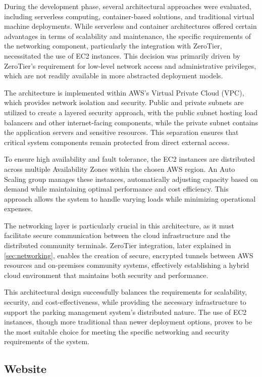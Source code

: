 During the development phase, several architectural approaches were evaluated, including serverless computing, container-based solutions, and traditional virtual machine deployments. While serverless and container architectures offered certain advantages in terms of scalability and maintenance, the specific requirements of the networking component, particularly the integration with ZeroTier, necessitated the use of EC2 instances. This decision was primarily driven by ZeroTier's requirement for low-level network access and administrative privileges, which are not readily available in more abstracted deployment models.

The architecture is implemented within AWS's Virtual Private Cloud (VPC), which provides network isolation and security. Public and private subnets are utilized to create a layered security approach, with the public subnet hosting load balancers and other internet-facing components, while the private subnet contains the application servers and sensitive resources. This separation ensures that critical system components remain protected from direct external access.

To ensure high availability and fault tolerance, the EC2 instances are distributed across multiple Availability Zones within the chosen AWS region. An Auto Scaling group manages these instances, automatically adjusting capacity based on demand while maintaining optimal performance and cost efficiency. This approach allows the system to handle varying loads while minimizing operational expenses.

The networking layer is particularly crucial in this architecture, as it must facilitate secure communication between the cloud infrastructure and the distributed community terminals. ZeroTier integration, later explained in \cref{sec:networking}, enables the creation of secure, encrypted tunnels between AWS resources and on-premises community systems, effectively establishing a hybrid cloud environment that maintains both security and performance.

This architectural design successfully balances the requirements for scalability, security, and cost-effectiveness, while providing the necessary infrastructure to support the parking management system's distributed nature. The use of EC2 instances, though more traditional than newer deployment options, proves to be the most suitable choice for meeting the specific networking and security requirements of the system.

\subsection{Website}

